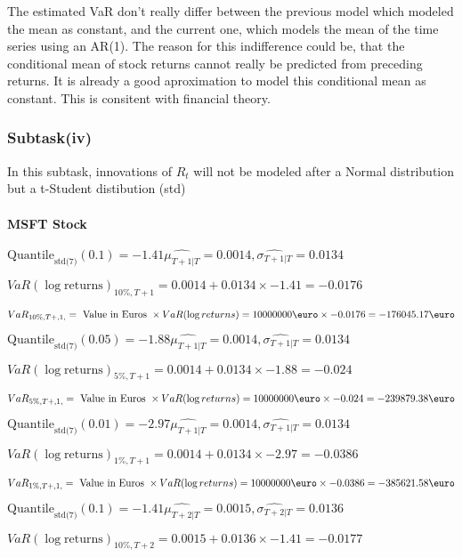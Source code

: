 The estimated VaR don't really differ between the previous model which modeled the mean as constant, and the current one, which models the mean of the time series using an AR(1). 
The reason for this indifference could be, that the conditional mean of stock returns cannot really be predicted from preceding returns. It is already a good aproximation to model this conditional mean as constant. This is consitent with financial theory.

\subsubsection{Subtask(iv)}
In this subtask, innovations of $R_t$ will not be modeled after a Normal distribution but a t-Student distibution (std) 

\paragraph{MSFT Stock}


$\text{Quantile}_\text{std(7)}(0.1) = -1.41$$\hat{\mu_{T+1|T}} = 0.0014, \hat{\sigma_{T+1|T}} = 0.0134$

$VaR(\log \text{returns})_{10\%, T + 1} = 0.0014 + 0.0134\times-1.41 = -0.0176$

$VaR_{10\%, T + ,1,} = \text{ Value in Euros } \times VaR(\log returns) = 10 000 000 \text{\euro} \times-0.0176 = -176045.17 \text{\euro}$


$\text{Quantile}_\text{std(7)}(0.05) = -1.88$$\hat{\mu_{T+1|T}} = 0.0014, \hat{\sigma_{T+1|T}} = 0.0134$

$VaR(\log \text{returns})_{5\%, T + 1} = 0.0014 + 0.0134\times-1.88 = -0.024$

$VaR_{5\%, T + ,1,} = \text{ Value in Euros } \times VaR(\log returns) = 10 000 000 \text{\euro} \times-0.024 = -239879.38 \text{\euro}$


$\text{Quantile}_\text{std(7)}(0.01) = -2.97$$\hat{\mu_{T+1|T}} = 0.0014, \hat{\sigma_{T+1|T}} = 0.0134$

$VaR(\log \text{returns})_{1\%, T + 1} = 0.0014 + 0.0134\times-2.97 = -0.0386$

$VaR_{1\%, T + ,1,} = \text{ Value in Euros } \times VaR(\log returns) = 10 000 000 \text{\euro} \times-0.0386 = -385621.58 \text{\euro}$


$\text{Quantile}_\text{std(7)}(0.1) = -1.41$$\hat{\mu_{T+2|T}} = 0.0015, \hat{\sigma_{T+2|T}} = 0.0136$

$VaR(\log \text{returns})_{10\%, T + 2} = 0.0015 + 0.0136\times-1.41 = -0.0177$

